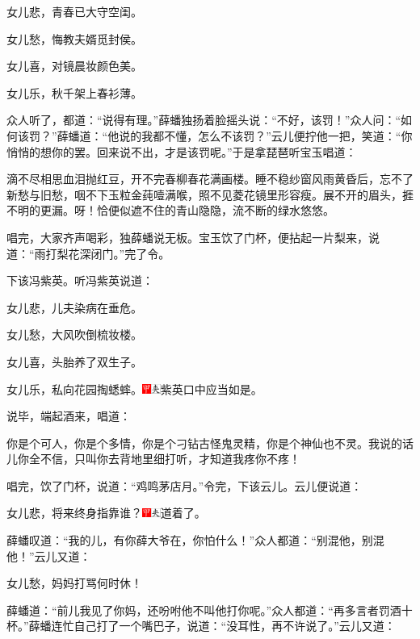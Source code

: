 女儿悲，青春已大守空闺。

女儿愁，悔教夫婿觅封侯。

女儿喜，对镜晨妆颜色美。

女儿乐，秋千架上春衫薄。

众人听了，都道：``说得有理。''薛蟠独扬着脸摇头说：``不好，该罚！''众人问：``如何该罚？''薛蟠道：``他说的我都不懂，怎么不该罚？''云儿便拧他一把，笑道：``你悄悄的想你的罢。回来说不出，才是该罚呢。''于是拿琵琶听宝玉唱道：

滴不尽相思血泪抛红豆，开不完春柳春花满画楼。睡不稳纱窗风雨黄昏后，忘不了新愁与旧愁，咽不下玉粒金莼噎满喉，照不见菱花镜里形容瘦。展不开的眉头，捱不明的更漏。呀！恰便似遮不住的青山隐隐，流不断的绿水悠悠。

唱完，大家齐声喝彩，独薛蟠说无板。宝玉饮了门杯，便拈起一片梨来，说道：``雨打梨花深闭门。''完了令。

下该冯紫英。听冯紫英说道：

女儿悲，儿夫染病在垂危。

女儿愁，大风吹倒梳妆楼。

女儿喜，头胎养了双生子。

女儿乐，私向花园掏蟋蟀。{\includegraphics[width=3mm]{../Images/00002}\includegraphics[width=3mm]{../Images/00012}\footnotesize \kaishu 紫英口中应当如是。}

说毕，端起酒来，唱道：

你是个可人，你是个多情，你是个刁钻古怪鬼灵精，你是个神仙也不灵。我说的话儿你全不信，只叫你去背地里细打听，才知道我疼你不疼！

唱完，饮了门杯，说道：``鸡鸣茅店月。''令完，下该云儿。云儿便说道：

女儿悲，将来终身指靠谁？{\includegraphics[width=3mm]{../Images/00002}\includegraphics[width=3mm]{../Images/00012}\footnotesize \kaishu 道着了。}

薛蟠叹道：``我的儿，有你薛大爷在，你怕什么！''众人都道：``别混他，别混他！''云儿又道：

女儿愁，妈妈打骂何时休！

薛蟠道：``前儿我见了你妈，还吩咐他不叫他打你呢。''众人都道：``再多言者罚酒十杯。''薛蟠连忙自己打了一个嘴巴子，说道：``没耳性，再不许说了。''云儿又道：


